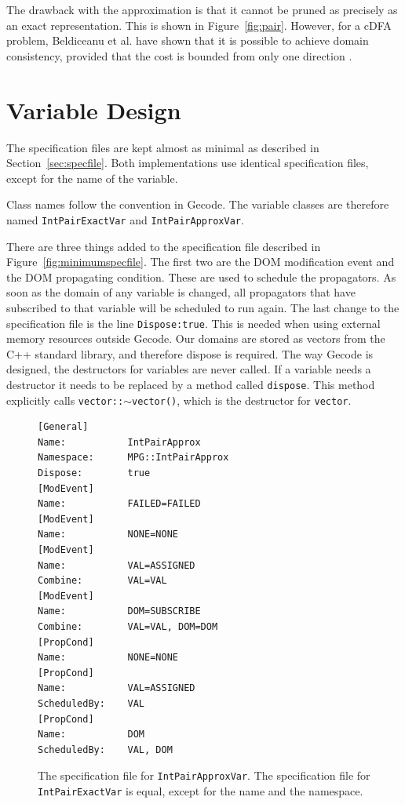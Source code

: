\documentclass[a4paper,11pt]{article}
\begin{document}
The drawback with the approximation is that it cannot be pruned as precisely as an exact representation. This is shown in Figure~\ref{fig:pair}. However, for a cDFA problem, Beldiceanu et al. have shown that it is possible to achieve domain consistency, provided that the cost is bounded from only one direction \cite{Beldiceanu675954}.



\section{Variable Design}
The specification files are kept almost as minimal as described in Section~\ref{sec:specfile}. Both implementations use identical specification files, except for the name of the variable. 

Class names follow the convention in Gecode. The variable classes are therefore named \texttt{IntPairExactVar} and \texttt{IntPairApproxVar}. 

There are three things added to the specification file described in Figure~\ref{fig:minimumspecfile}. The first two are the DOM modification event and the DOM propagating condition. These are used to schedule the propagators. As soon as the domain of any variable is changed, all propagators that have subscribed to that variable will be scheduled to run again. The last change to the specification file is the line \texttt{Dispose:true}. This is needed when using external memory resources outside Gecode. Our domains are stored as vectors from the C++ standard library, and therefore dispose is required. The way Gecode is designed, the destructors for variables are never called. If a variable needs a destructor it needs to be replaced by a method called \texttt{dispose}. This method explicitly calls \texttt{vector::$\sim$vector()}, which is the destructor for \texttt{vector}.

\begin{figure}[t]
\begin{minipage}{\linewidth}
\begin{lstlisting}[frame=single]
[General]
Name:           IntPairApprox
Namespace:      MPG::IntPairApprox
Dispose:        true
[ModEvent]
Name:           FAILED=FAILED
[ModEvent]
Name:           NONE=NONE
[ModEvent]
Name:           VAL=ASSIGNED
Combine:        VAL=VAL
[ModEvent]
Name:           DOM=SUBSCRIBE
Combine:        VAL=VAL, DOM=DOM
[PropCond]
Name:           NONE=NONE
[PropCond]
Name:           VAL=ASSIGNED
ScheduledBy:    VAL
[PropCond]
Name:           DOM
ScheduledBy:    VAL, DOM
\end{lstlisting}
\end{minipage}
\caption{The specification file for \texttt{IntPairApproxVar}. The specification file for \texttt{IntPairExactVar} is equal, except for the name and the namespace.}
\end{figure}
\end{document}
